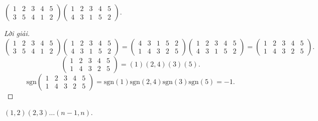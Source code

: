 \documentclass[class=linearalgebra,crop=false]{standalone}
\newcommand{\sgn}[1]{\text{sgn}\left({#1}\right)}
\begin{document}
\begin{exercise}
    $
        \begin{pmatrix}
            1 & 2 & 3 & 4 & 5 \\
            3 & 5 & 4 & 1 & 2
        \end{pmatrix}
        \begin{pmatrix}
            1 & 2 & 3 & 4 & 5 \\
            4 & 3 & 1 & 5 & 2
        \end{pmatrix}
    $.
\end{exercise}

\begin{proof}[Lời giải]
    \[
        \begin{pmatrix}
            1 & 2 & 3 & 4 & 5 \\
            3 & 5 & 4 & 1 & 2
        \end{pmatrix}
        \begin{pmatrix}
            1 & 2 & 3 & 4 & 5 \\
            4 & 3 & 1 & 5 & 2
        \end{pmatrix}
        =
        \begin{pmatrix}
            4 & 3 & 1 & 5 & 2 \\
            1 & 4 & 3 & 2 & 5
        \end{pmatrix}
        \begin{pmatrix}
            1 & 2 & 3 & 4 & 5 \\
            4 & 3 & 1 & 5 & 2
        \end{pmatrix}
        =
        \begin{pmatrix}
            1 & 2 & 3 & 4 & 5 \\
            1 & 4 & 3 & 2 & 5
        \end{pmatrix}.
    \]
    \[
        \begin{pmatrix}
            1 & 2 & 3 & 4 & 5 \\
            1 & 4 & 3 & 2 & 5
        \end{pmatrix}
        =
        (1)(2,4)(3)(5).
    \]
    \[
        \sgn{
            \begin{matrix}
                1 & 2 & 3 & 4 & 5 \\
                1 & 4 & 3 & 2 & 5
            \end{matrix}
        }
        = \sgn{1}\sgn{2,4}\sgn{3}\sgn{5}
        = -1.
    \]
\end{proof}

\begin{exercise}
    $(1,2)(2,3)\ldots (n-1,n)$.
\end{exercise}
\end{document}
